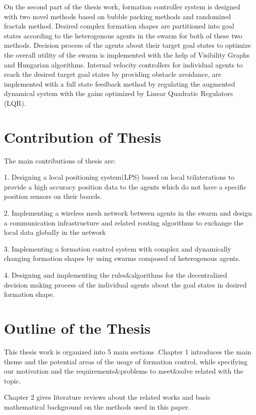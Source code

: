 On the second part of the thesis work, formation controller system is designed with two novel methods based on bubble packing methods and randomized fractals method. Desired complex formation shapes are partitioned into goal states according to the heterogenous agents in the swarm for both of these two methods. Decision process of the agents about their target goal states to optimize the overall utility of the swarm is implemented with the help of Visibility Graphs and Hungarian algorithms. Internal velocity controllers for individual agents to reach the desired target goal states by providing obstacle avoidance, are implemented with a full state feedback method by regulating the augmented dynamical system with the gains optimized by Linear Quadratic Regulators (LQR).

\section{Contribution of Thesis}
The main contributions of thesis are:

1. Designing a local positioning system(LPS) based on local trilaterations to provide a high accuracy position data to the agents which do not have a specific position sensors on their boards.

2. Implementing a wireless mesh network between agents in the swarm and design a communication infrastructure and related routing algorithms to exchange the local data globally in the network

3. Implementing a formation control system with complex and dynamically changing formation shapes by using swarms composed of heterogenous agents.

4. Designing and implementing the rules$\&$algorithms for the decentralized decision making process of the individual agents about the goal states in desired formation shape.


\section{Outline of the Thesis}
This thesis work is organized into 5 main sections .Chapter 1 introduces the main theme and the potential areas of the usage of formation control, while specifying our motivation and the requirements$\&$problems to meet$\&$solve related with the topic.

Chapter 2 gives literature reviews about the related works and basic mathematical background on the methods used in this paper.

